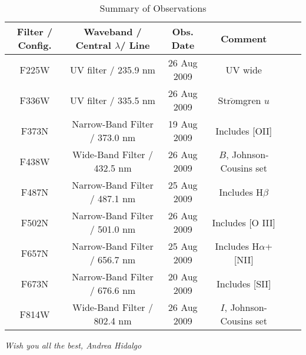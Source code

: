 \documentclass[11pt,fleqn]{book}
\begin{document}
 
 \begin{table}[h]
  \centering
  \begin{tabular}{ c c c c c c }
    \hline\hline
    Filter / Config. & Waveband / Central $\lambda$/ Line & Obs. Date & Comment \\
    \hline
    F225W & UV filter / 235.9 nm & 26 Aug 2009 &  UV wide\\
    
    F336W & UV filter / 335.5 nm & 26 Aug 2009 & Str$\ddot{o}$mgren $u$\\
    
    F373N & Narrow-Band Filter / 373.0 nm & 19 Aug 2009 & Includes \textsc{[OII]}\\
    
    F438W & Wide-Band Filter / 432.5 nm & 26 Aug 2009 & $B$, Johnson-Cousins set\\
    
    F487N & Narrow-Band Filter / 487.1 nm & 25 Aug 2009 & Includes H$\beta$\\
    
    F502N & Narrow-Band Filter / 501.0 nm & 26 Aug 2009 & Includes \textsc{[O III]}\\
    
    F657N & Narrow-Band Filter / 656.7 nm & 25 Aug 2009 & Includes H$\alpha$+\textsc{[NII]}\\
    
    F673N & Narrow-Band Filter / 676.6 nm & 20 Aug 2009 & Includes \textsc{[SII]}\\
    
    F814W & Wide-Band Filter / 802.4 nm & 26 Aug 2009 & $I$, Johnson-Cousins set\\
    \hline
  \end{tabular}
  \caption{Summary of Observations}
  \label{tab:uno}
\end{table}





\vfill
\textit{Wish you all the best, Andrea Hidalgo}
\end{document}
